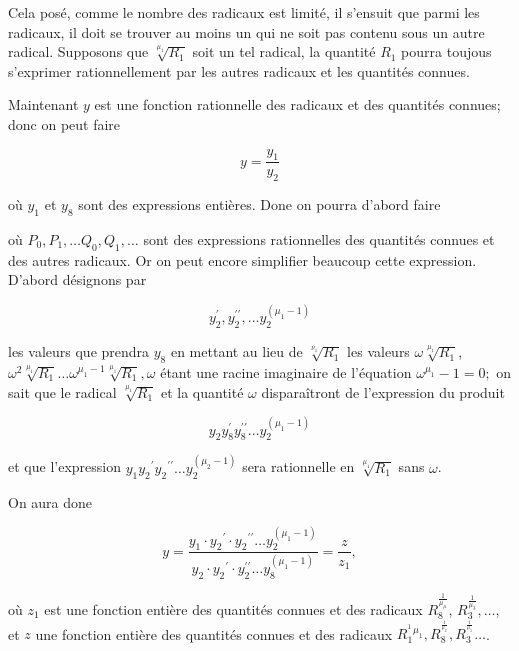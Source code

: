 \documentclass{article}
\begin{document}
Cela posé, comme le nombre des radicaux est limité, il s'ensuit que parmi les radicaux, il doit se trouver au moins un qui ne soit pas contenu sous un autre radical. Supposons que \(\sqrt[\mu_{1}]{R_{1}}\) soit un tel radical, la quantité \(R_{1}\) pourra toujous s'exprimer rationnellement par les autres radicaux et les quantités connues.

Maintenant \(y\) est une fonction rationnelle des radicaux et des quantités connues; donc on peut faire

\[
y=\frac{y_{1}}{y_{2}}
\]

où \(y_{1}\) et \(y_{8}\) sont des expressions entières. Done on pourra d'abord faire


où \(P_{0}, P_{1}, \ldots Q_{0}, Q_{1}, \ldots\) sont des expressions rationnelles des quantités connues et des autres radicaux. Or on peut encore simplifier beaucoup cette expression. D'abord désignons par

\[
y_{2}^{\prime}, y_{2}^{\prime \prime}, \ldots y_{2}^{\left(\mu_{1}-1\right)}
\]

les valeurs que prendra \(y_{8}\) en mettant au lieu de \(\sqrt[\nu_{1}]{R_{1}}\) les valeurs \(\omega \sqrt[\mu_{1}]{R_{1}}\), \(\omega^{2} \sqrt[\mu_{1}]{R_{1}} \ldots \omega^{\mu_{1}-1} \sqrt[\mu_{1}]{R_{1}}, \omega\) étant une racine imaginaire de l'équation \(\omega^{\mu_{1}}-1=0 ;\) on sait que le radical \(\sqrt[\mu_{1}]{R_{1}}\) et la quantité \(\omega\) disparaîtront de l'expression du produit

\[
y_{2} y_{8}^{\prime} y_{8}^{\prime \prime} \ldots y_{2}^{\left(\mu_{1}-1\right)}
\]

et que l'expression \(y_{1} y_{2}{ }^{\prime} y_{2}{ }^{\prime \prime} \ldots y_{2}^{\left(\mu_{2}-1\right)}\) sera rationnelle en \(\sqrt[\mu_{1}]{R_{1}}\) sans \(\omega\).

On aura done

\[
y=\frac{y_{1} \cdot y_{2}{ }^{\prime} \cdot y_{2}{ }^{\prime \prime} \ldots y_{2}^{\left(\mu_{1}-1\right)}}{y_{2} \cdot y_{2}{ }^{\prime} \cdot y_{2}^{\prime \prime} \ldots y_{8}^{\left(\mu_{1}-1\right)}}=\frac{z}{z_{1}},
\]

où \(z_{1}\) est une fonction entière des quantités connues et des radicaux \(R_{8}^{\frac{1}{\mu_{\mu}}}\),
\(R_{3}^{\frac{1}{\mu_{3}}}, \ldots\), et \(z\) une fonction entière des quantités connues et des radicaux \(R_{1}^{{ }^{1}}{ }^{\mu_{1}}, R_{8}^{{ }^{\frac{1}{\mu_{2}}}}, R_{3}^{{ }^{\frac{1}{\mu_{3}}}} \ldots\).
\end{document}

